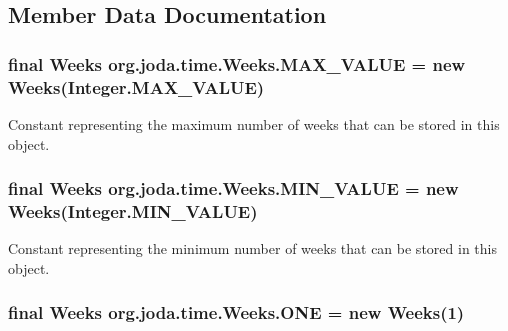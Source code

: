 \subsection{Member Data Documentation}
\hypertarget{classorg_1_1joda_1_1time_1_1_weeks_abfd3e1a51c4c3070f3c9d596e3442338}{
\subsubsection[{M\-A\-X\-\_\-\-V\-A\-L\-U\-E}]{\setlength{\rightskip}{0pt plus 5cm}final {\bf Weeks} org.\-joda.\-time.\-Weeks.\-M\-A\-X\-\_\-\-V\-A\-L\-U\-E = new {\bf Weeks}(Integer.\-M\-A\-X\-\_\-\-V\-A\-L\-U\-E)\hspace{0.3cm}{\ttfamily [static]}}}\label{classorg_1_1joda_1_1time_1_1_weeks_abfd3e1a51c4c3070f3c9d596e3442338}
Constant representing the maximum number of weeks that can be stored in this object. \hypertarget{classorg_1_1joda_1_1time_1_1_weeks_aac9dbd14f0109400dc93040e895f6b16}{
\subsubsection[{M\-I\-N\-\_\-\-V\-A\-L\-U\-E}]{\setlength{\rightskip}{0pt plus 5cm}final {\bf Weeks} org.\-joda.\-time.\-Weeks.\-M\-I\-N\-\_\-\-V\-A\-L\-U\-E = new {\bf Weeks}(Integer.\-M\-I\-N\-\_\-\-V\-A\-L\-U\-E)\hspace{0.3cm}{\ttfamily [static]}}}\label{classorg_1_1joda_1_1time_1_1_weeks_aac9dbd14f0109400dc93040e895f6b16}
Constant representing the minimum number of weeks that can be stored in this object. \hypertarget{classorg_1_1joda_1_1time_1_1_weeks_a716e1ca9d658b42d1a9befe7254620ef}{
\subsubsection[{O\-N\-E}]{\setlength{\rightskip}{0pt plus 5cm}final {\bf Weeks} org.\-joda.\-time.\-Weeks.\-O\-N\-E = new {\bf Weeks}(1)\hspace{0.3cm}{\ttfamily [static]}}}\label{classorg_1_1joda_1_1time_1_1_weeks_a716e1ca9d658b42d1a9befe7254620ef}
